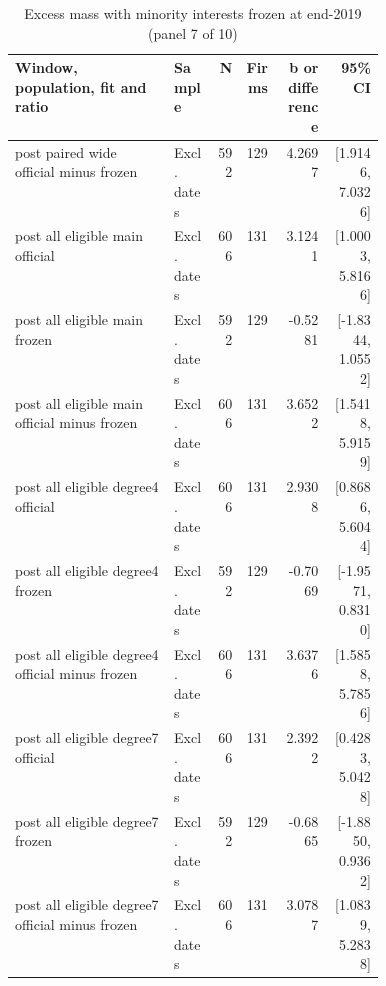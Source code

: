 \begin{table}[!htbp]\centering\scriptsize
\caption{Excess mass with minority interests frozen at end-2019 (panel 7 of 10)}
\begin{threeparttable}
\begin{tabular}{p{0.43\linewidth}lrrrr}
\toprule
Window, population, fit and ratio & Sample & N & Firms & b or difference & 95\% CI \\
\midrule
post paired wide official minus frozen & Excl. dates & 592 & 129 & 4.2697 & [1.9146, 7.0326] \\
post all eligible main official & Excl. dates & 606 & 131 & 3.1241 & [1.0003, 5.8166] \\
post all eligible main frozen & Excl. dates & 592 & 129 & -0.5281 & [-1.8344, 1.0552] \\
post all eligible main official minus frozen & Excl. dates & 606 & 131 & 3.6522 & [1.5418, 5.9159] \\
post all eligible degree4 official & Excl. dates & 606 & 131 & 2.9308 & [0.8686, 5.6044] \\
post all eligible degree4 frozen & Excl. dates & 592 & 129 & -0.7069 & [-1.9571, 0.8310] \\
post all eligible degree4 official minus frozen & Excl. dates & 606 & 131 & 3.6376 & [1.5858, 5.7856] \\
post all eligible degree7 official & Excl. dates & 606 & 131 & 2.3922 & [0.4283, 5.0428] \\
post all eligible degree7 frozen & Excl. dates & 592 & 129 & -0.6865 & [-1.8850, 0.9362] \\
post all eligible degree7 official minus frozen & Excl. dates & 606 & 131 & 3.0787 & [1.0839, 5.2838] \\
\bottomrule
\end{tabular}
\begin{tablenotes}[flushleft]\footnotesize

\end{tablenotes}
\end{threeparttable}
\end{table}
